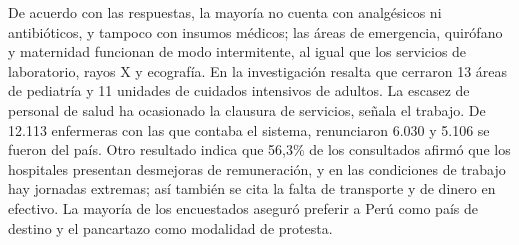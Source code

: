 \documentclass{article}%
\begin{document}
\newline%
%
De acuerdo con las respuestas, la mayoría no cuenta con analgésicos ni antibióticos, y tampoco con insumos médicos; las áreas de emergencia, quirófano y maternidad funcionan de modo intermitente, al igual que los servicios de laboratorio, rayos X y ecografía. En la investigación resalta que cerraron 13 áreas de pediatría y 11 unidades de cuidados intensivos de adultos.%
\newline%
%
La escasez de personal de salud ha ocasionado la clausura de servicios, señala el trabajo. De 12.113 enfermeras con las que contaba el sistema, renunciaron 6.030 y 5.106 se fueron del país.%
\newline%
%
Otro resultado indica que 56,3\% de los consultados afirmó que los hospitales presentan desmejoras de remuneración, y en las condiciones de trabajo hay jornadas extremas; así también se cita la falta de transporte y de dinero en efectivo.%
\newline%
%
La mayoría de los encuestados aseguró preferir a Perú como país de destino y el pancartazo como modalidad de protesta.%
\newline%
%
\end{document}
